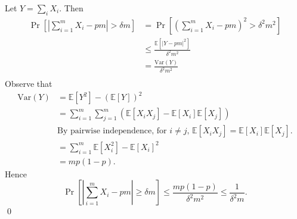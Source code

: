 \proof
Let $Y = \sum_i X_i$. Then
\begin{align*}
\Pr\left[\left|\sum_{i=1}^m X_i - pm\right| > \delta m\right] &=
\Pr\left[\left(\sum_{i=1}^m X_i - pm\right)^2> \delta^2 m^2\right]\\
&\leq \frac{\mathbb{E}\left[\left|Y - pm\right|^2\right]}{\delta^2m^2}\\
&= \frac{\text{Var}(Y)}{\delta^2m^2}\\
\end{align*}
Observe that
\begin{align*}
\text{Var}(Y) &= \mathbb{E}\left[Y^2\right] - \left(\mathbb{E}[Y]\right)^2\\
&= \sum_{i=1}^m \sum_{j=1}^m \left( \mathbb{E}\left[X_iX_j\right] - \mathbb{E}\left[X_i\right] \mathbb{E}\left[X_j\right]\right)\\
& \text{By pairwise independence, for $i \neq j$,  $\mathbb{E}\left[X_iX_j\right] = \mathbb{E}\left[X_i\right] \mathbb{E}\left[X_j\right]$.}\\
&= \sum_{i=1}^m \mathbb{E}\left[X_i^2\right] - \mathbb{E}\left[X_i\right]^2\\
&= mp(1-p).
\end{align*}
Hence
$$\Pr\left[\left|\sum_{i=1}^m X_i - pm\right| \geq\delta m\right] \leq \frac{mp(1-p)}{\delta^2m^2} \leq \frac{1}{\delta^2m}.$$
\qed





